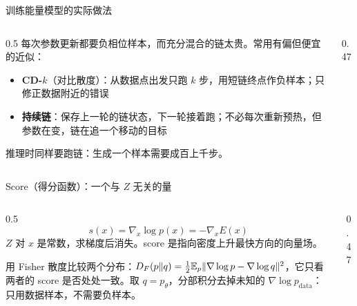 \documentclass[aspectratio=169,10pt,UTF8,fontset=none]{ctexbeamer}
\begin{document}
\begin{frame}{训练能量模型的实际做法}
  \begin{columns}[T]
    \begin{column}{0.5\textwidth}
      每次参数更新都要负相位样本，而充分混合的链太贵。常用有偏但便宜的近似：
      \begin{itemize}
        \item \textbf{CD-$k$}（对比散度）：从数据点出发只跑 $k$ 步，用短链终点作负样本；只修正数据附近的错误
        \item \textbf{持续链}：保存上一轮的链状态，下一轮接着跑；不必每次重新预热，但参数在变，链在追一个移动的目标
      \end{itemize}
      推理时同样要跑链：生成一个样本需要成百上千步。
    \end{column}
    \begin{column}{0.47\textwidth}
    \end{column}
  \end{columns}
\end{frame}

\begin{frame}{Score（得分函数）：一个与 $Z$ 无关的量}
  \begin{columns}[c]
    \begin{column}{0.5\textwidth}
      \[
        s(x)=\nabla_x\log p(x)=-\nabla_xE(x)
      \]
      $Z$ 对 $x$ 是常数，求梯度后消失。score 是指向密度上升最快方向的向量场。
      \begin{keystep}
        用 Fisher 散度比较两个分布：$D_F(p\Vert q)=\tfrac12\mathbb{E}_p\|\nabla\log p-\nabla\log q\|^2$，它只看两者的 score 是否处处一致。取 $q=p_\theta$，分部积分去掉未知的 $\nabla\log p_{\mathrm{data}}$：
        只用数据样本，不需要负样本。
      \end{keystep}
    \end{column}
    \begin{column}{0.47\textwidth}
      \centering
      \par\vspace{1mm}
      {\scriptsize{}}
    \end{column}
  \end{columns}
\end{frame}
\end{document}
